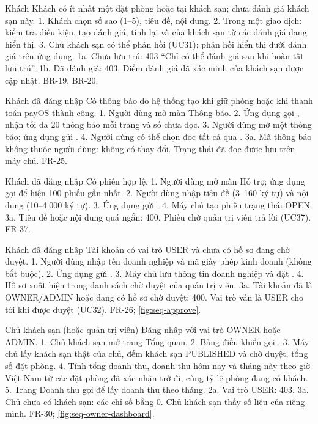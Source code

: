 {Khách}
{Khách có ít nhất một đặt phòng  hoặc  tại khách sạn; chưa đánh giá khách sạn này.}
{1. Khách chọn số sao (1--5), tiêu đề, nội dung. 2. Trong một giao dịch: kiểm tra điều kiện, tạo đánh giá, tính lại  và  của khách sạn từ các đánh giá đang hiển thị. 3. Chủ khách sạn có thể phản hồi (UC31); phản hồi hiển thị dưới đánh giá trên ứng dụng.}
{1a. Chưa lưu trú: 403 ``Chỉ có thể đánh giá sau khi hoàn tất lưu trú''. 1b. Đã đánh giá: 403.}
{Điểm đánh giá đã xác minh của khách sạn được cập nhật.}
{BR-19, BR-20.}

{Khách đã đăng nhập}
{Có thông báo do hệ thống tạo khi giữ phòng hoặc khi thanh toán payOS thành công.}
{1. Người dùng mở màn Thông báo. 2. Ứng dụng gọi , nhận tối đa 20 thông báo mỗi trang và số chưa đọc. 3. Người dùng mở một thông báo; ứng dụng gửi . 4. Người dùng có thể chọn đọc tất cả qua .}
{3a. Mã thông báo không thuộc người dùng: không có thay đổi.}
{Trạng thái đã đọc được lưu trên máy chủ.}
{FR-25.}

{Khách đã đăng nhập}
{Có phiên hợp lệ.}
{1. Người dùng mở màn Hỗ trợ; ứng dụng gọi  để hiện 100 phiếu gần nhất. 2. Người dùng nhập tiêu đề (3--160 ký tự) và nội dung (10--4.000 ký tự). 3. Ứng dụng gửi . 4. Máy chủ tạo phiếu trạng thái OPEN.}
{3a. Tiêu đề hoặc nội dung quá ngắn: 400.}
{Phiếu chờ quản trị viên trả lời (UC37).}
{FR-37.}

{Khách đã đăng nhập}
{Tài khoản có vai trò USER và chưa có hồ sơ đang chờ duyệt.}
{1. Người dùng nhập tên doanh nghiệp và mã giấy phép kinh doanh (không bắt buộc). 2. Ứng dụng gửi . 3. Máy chủ lưu thông tin doanh nghiệp và đặt . 4. Hồ sơ xuất hiện trong danh sách chờ duyệt của quản trị viên.}
{3a. Tài khoản đã là OWNER/ADMIN hoặc đang có hồ sơ chờ duyệt: 400.}
{Vai trò vẫn là USER cho tới khi được duyệt (UC32).}
{FR-26; \cref{fig:seq-approve}.}

{Chủ khách sạn (hoặc quản trị viên)}
{Đăng nhập với vai trò OWNER hoặc ADMIN.}
{1. Chủ khách sạn mở trang Tổng quan. 2. Bảng điều khiển gọi . 3. Máy chủ lấy khách sạn thật của chủ, đếm khách sạn PUBLISHED và chờ duyệt, tổng số đặt phòng. 4. Tính tổng doanh thu, doanh thu hôm nay và tháng này theo giờ Việt Nam từ các đặt phòng đã xác nhận trở đi, cùng tỷ lệ phòng đang có khách. 5. Trang Doanh thu gọi  để lấy doanh thu theo tháng.}
{2a. Vai trò USER: 403. 3a. Chủ chưa có khách sạn: các chỉ số bằng 0.}
{Chủ khách sạn thấy số liệu của riêng mình.}
{FR-30; \cref{fig:seq-owner-dashboard}.}

